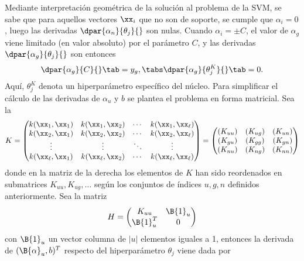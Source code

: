 %
Mediante interpretación geométrica de la solución al problema de la
SVM, se sabe que para aquellos vectores $\xx_i$ que no son de soporte,
se cumple que $\alpha_i=0$, luego las derivadas
$\dpar{\alpha_n}{\theta_j}{}$ son nulas. Cuando
$\alpha_i=\pm{}C$, el valor de $\alpha_g$ viene limitado (en valor absoluto) por el
parámetro $C$, y las derivadas $\dpar{\alpha_g}{\theta_j}{}$ son entonces
%
\begin{align}
  \dpar{\alpha_g}{C}{} \tab= y_g, \tabs \dpar{\alpha_g}{{\theta}^K_j}{} \tab= 0.
\end{align}
%
Aquí, $\theta_j^K$ denota un hiperparámetro específico del núcleo.
Para simplificar el cálculo de las derivadas de $\alpha_u$ y $b$ se
plantea el problema en forma matricial. Sea la 
%
\begin{align}
  K = \begin{pmatrix} k(\xx_1,\xx_1) & k(\xx_1,\xx_2) & \cdots & k(\xx_1,\xx_\ell)
    \\ k(\xx_2,\xx_1) & k(\xx_2,\xx_2) & \cdots & k(\xx_2,\xx_\ell) \\ \vdots &
    \vdots & \ddots & \vdots \\ k(\xx_\ell,\xx_1) & k(\xx_\ell,\xx_2) & \cdots &
    k(\xx_\ell,\xx_\ell)
  \end{pmatrix}
  =
  \begin{pmatrix}
    (K_{uu}) & (K_{ug}) & (K_{un}) \\
    (K_{gu}) & (K_{gg}) & (K_{gn}) \\
    (K_{nu}) & (K_{ng}) & (K_{nn})
  \end{pmatrix}
\end{align}
%
donde en la matriz de la derecha los elementos de $K$ han sido
reordenados en submatrices $K_{uu},K_{ug},\ldots$ según los conjuntos
de índices $u, g, n$ definidos anteriormente.  Sea la matriz
%
\begin{align}
  H=\begin{pmatrix} K_{uu} & \B{1}_u \\ \B{1}_u^T & 0
  \end{pmatrix}
\end{align}
%
con $\B{1}_u$ un vector columna de $|u|$ elementos iguales a 1,
entonces la derivada de $(\B{\alpha}_u,b)^T$ respecto del
hiperparámetro $\theta_j$ viene dada por
%
